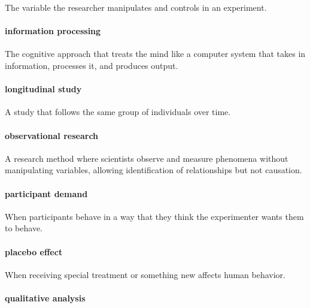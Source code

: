 \documentclass[
]{krantz}
\begin{document}
The variable the researcher manipulates and controls in an experiment.

\paragraph*{information processing}\label{information-processing}

The cognitive approach that treats the mind like a computer system that takes in information, processes it, and produces output.

\paragraph*{longitudinal study}\label{longitudinal-study}

A study that follows the same group of individuals over time.

\paragraph*{observational research}\label{observational-research-1}

A research method where scientists observe and measure phenomena without manipulating variables, allowing identification of relationships but not causation.

\paragraph*{participant demand}\label{participant-demand}

When participants behave in a way that they think the experimenter wants them to behave.

\paragraph*{placebo effect}\label{placebo-effect}

When receiving special treatment or something new affects human behavior.

\paragraph*{qualitative analysis}\label{qualitative-analysis}
\end{document}
